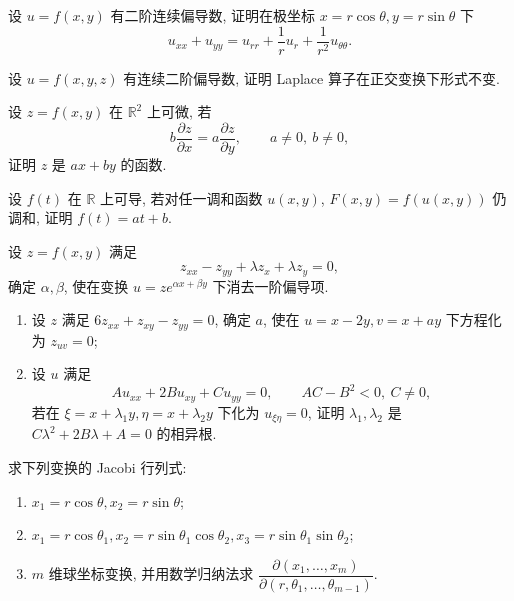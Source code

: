 \documentclass[../../数学分析培优讲义.tex]{subfiles}
\begin{document}
\begin{example}
设 $u=f(x,y)$ 有二阶连续偏导数, 证明在极坐标 $x=r\cos\theta,y=r\sin\theta$ 下
\[
    u_{xx}+u_{yy}=u_{rr}+\dfrac{1}{r}u_r+\dfrac{1}{r^2}u_{\theta\theta}.
\]
\end{example}
\exampleblank

\begin{example}
设 $u=f(x,y,z)$ 有连续二阶偏导数, 证明 Laplace 算子在正交变换下形式不变.
\end{example}
\exampleblank

\begin{example}
设 $z=f(x,y)$ 在 $\mathbb{R}^2$ 上可微, 若
\[
    b\dfrac{\partial z}{\partial x}=a\dfrac{\partial z}{\partial y},
    \qquad a\ne0,\ b\ne0,
\]
证明 $z$ 是 $ax+by$ 的函数.
\end{example}
\exampleblank

\begin{example}
设 $f(t)$ 在 $\mathbb{R}$ 上可导, 若对任一调和函数 $u(x,y)$, $F(x,y)=f(u(x,y))$ 仍调和, 证明 $f(t)=at+b$.
\end{example}
\exampleblank

\begin{example}
设 $z=f(x,y)$ 满足
\[
    z_{xx}-z_{yy}+\lambda z_x+\lambda z_y=0,
\]
确定 $\alpha,\beta$, 使在变换 $u=ze^{\alpha x+\beta y}$ 下消去一阶偏导项.
\end{example}
\exampleblank

\begin{example}[\markstar]
\begin{enumerate}[label=(\arabic*)]
    \item 设 $z$ 满足 $6z_{xx}+z_{xy}-z_{yy}=0$, 确定 $a$, 使在 $u=x-2y,v=x+ay$ 下方程化为 $z_{uv}=0$;
    \item 设 $u$ 满足
    \[
        Au_{xx}+2Bu_{xy}+Cu_{yy}=0,
        \qquad AC-B^2<0,\ C\ne0,
    \]
    若在 $\xi=x+\lambda_1y,\eta=x+\lambda_2y$ 下化为 $u_{\xi\eta}=0$, 证明 $\lambda_1,\lambda_2$ 是 $C\lambda^2+2B\lambda+A=0$ 的相异根.
\end{enumerate}
\end{example}
\exampleblank

\begin{example}[\markstar]
求下列变换的 Jacobi 行列式:
\begin{enumerate}[label=(\arabic*)]
    \item $x_1=r\cos\theta,x_2=r\sin\theta$;
    \item $x_1=r\cos\theta_1,x_2=r\sin\theta_1\cos\theta_2,x_3=r\sin\theta_1\sin\theta_2$;
    \item $m$ 维球坐标变换, 并用数学归纳法求 $\dfrac{\partial(x_1,\ldots,x_m)}{\partial(r,\theta_1,\ldots,\theta_{m-1})}$.
\end{enumerate}
\end{example}
\exampleblank
\end{document}
